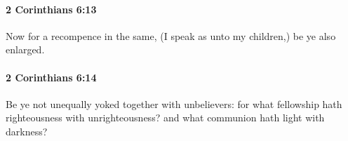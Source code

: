 		\paragraph{2 Corinthians 6:13} %
			\label{2CORINTHIANS-6-13}

			Now for a recompence in the same, (I speak as unto my children,) be ye also enlarged.

			\begin{framed}
			\scriptsize
				\begin{compactdesc}
					\item[SBLG] 
				\end{compactdesc}
			\end{framed}

		\paragraph{2 Corinthians 6:14} %
			\label{2CORINTHIANS-6-14}

			Be ye not unequally yoked together with unbelievers: for what fellowship hath righteousness with unrighteousness?  and what communion hath light with darkness?

